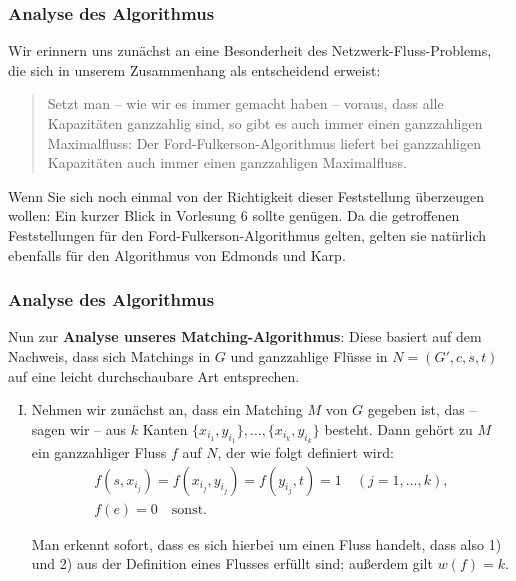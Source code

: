 \documentclass[smaller]{beamer}
\begin{document}
\begin{frame}
 \frametitle{Analyse des Algorithmus}
 Wir erinnern uns zunächst an eine \alert{Besonderheit des Netzwerk-Fluss-Problems}, die sich in unserem Zusammenhang als entscheidend erweist:
\begin{quote}
\alert{Setzt man -- wie wir es immer gemacht haben -- voraus, dass alle Kapazitäten ganzzahlig sind, so gibt es auch immer einen ganzzahligen Maximalfluss: Der Ford-Fulkerson-Algorithmus liefert bei ganzzahligen Kapazitäten auch immer einen ganzzahligen Maximalfluss.}
\end{quote}
Wenn Sie sich noch einmal von der Richtigkeit dieser Feststellung überzeugen wollen: Ein kurzer Blick in Vorlesung 6 sollte genügen. Da die getroffenen Feststellungen für den Ford-Fulkerson-Algorithmus gelten, gelten sie natürlich ebenfalls für den Algorithmus von Edmonds und Karp.
\end{frame}

\begin{frame}
 \frametitle{Analyse des Algorithmus}
 Nun zur \textbf{Analyse unseres Matching-Algorithmus}: \alert{Diese basiert auf dem Nachweis, dass sich Matchings in $G$ und ganzzahlige Flüsse in $N = (G',c,s,t)$ auf eine leicht durchschaubare Art entsprechen}.

\begin{enumerate}[I)]
\item Nehmen wir zunächst an, dass ein Matching $M$ von $G$ gegeben ist, das -- sagen wir -- aus $k$ Kanten $\big\{ x_{i_1}, y_{i_1}\big\}, \ldots, \big\{ x_{i_k}, y_{i_k} \big\}$ besteht. Dann gehört zu $M$ ein ganzzahliger Fluss $f$ auf $N$, der wie folgt definiert wird:
\[
\begin{array}{c}
f(s, x_{i_j}) = f(x_{i_j}, y_{i_j}) = f(y_{i_j}, t) = 1 \quad (j = 1,\ldots,k), \\[2mm]
f(e) = 0 \quad \text{sonst.}
\end{array}
\]

Man erkennt sofort, dass es sich hierbei um einen Fluss handelt, dass also 1) und 2) aus der Definition eines Flusses erfüllt sind; außerdem gilt $w(f) = k$.
\end{enumerate}
\end{frame}
\end{document}
